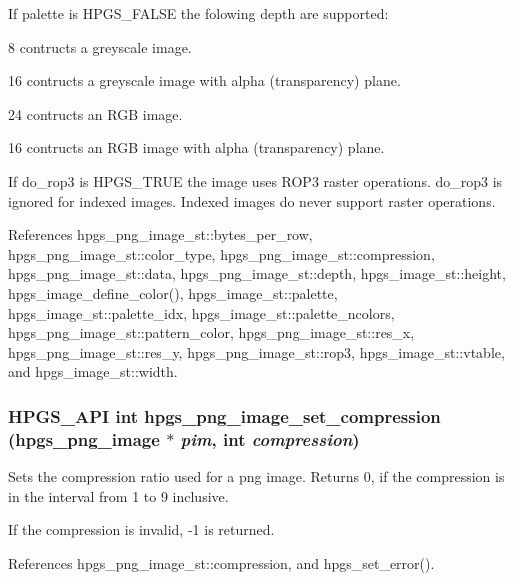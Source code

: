 If {\ttfamily palette} is {\ttfamily HPGS\_\-FALSE} the folowing depth are supported: \begin{DoxyItemize}
\item 8 contructs a greyscale image. \item 16 contructs a greyscale image with alpha (transparency) plane. \item 24 contructs an RGB image. \item 16 contructs an RGB image with alpha (transparency) plane.\end{DoxyItemize}
If {\ttfamily do\_\-rop3} is {\ttfamily HPGS\_\-TRUE} the image uses ROP3 raster operations. {\ttfamily do\_\-rop3} is ignored for indexed images. Indexed images do never support raster operations. 

References hpgs\_\-png\_\-image\_\-st::bytes\_\-per\_\-row, hpgs\_\-png\_\-image\_\-st::color\_\-type, hpgs\_\-png\_\-image\_\-st::compression, hpgs\_\-png\_\-image\_\-st::data, hpgs\_\-png\_\-image\_\-st::depth, hpgs\_\-image\_\-st::height, hpgs\_\-image\_\-define\_\-color(), hpgs\_\-image\_\-st::palette, hpgs\_\-image\_\-st::palette\_\-idx, hpgs\_\-image\_\-st::palette\_\-ncolors, hpgs\_\-png\_\-image\_\-st::pattern\_\-color, hpgs\_\-png\_\-image\_\-st::res\_\-x, hpgs\_\-png\_\-image\_\-st::res\_\-y, hpgs\_\-png\_\-image\_\-st::rop3, hpgs\_\-image\_\-st::vtable, and hpgs\_\-image\_\-st::width.

\subsubsection[{hpgs\_\-png\_\-image\_\-set\_\-compression}]{\setlength{\rightskip}{0pt plus 5cm}HPGS\_\-API int hpgs\_\-png\_\-image\_\-set\_\-compression ({\bf hpgs\_\-png\_\-image} $\ast$ {\em pim}, \/  int {\em compression})}\label{group__image_ga8ce473703db5e914363733df424e81cc}
Sets the compression ratio used for a png image. Returns 0, if the compression is in the interval from 1 to 9 inclusive.

If the compression is invalid, -\/1 is returned. 

References hpgs\_\-png\_\-image\_\-st::compression, and hpgs\_\-set\_\-error().

